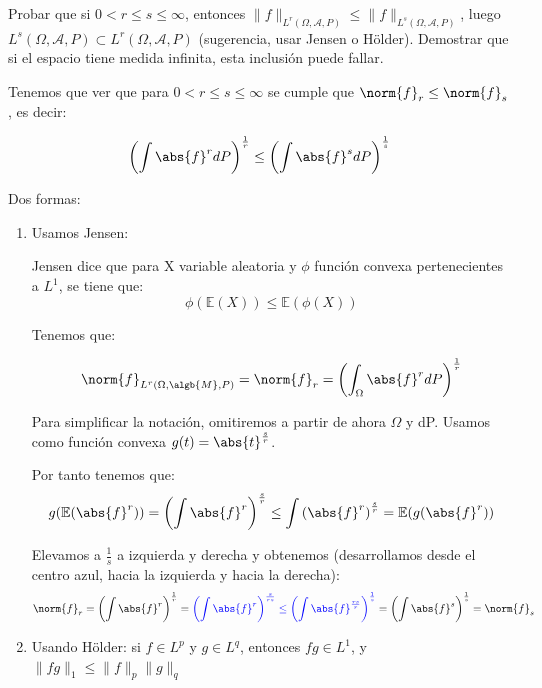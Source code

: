 \begin{problem}[8] Probar que si $0 < r\le s \le \infty$,
 entonces $\|f\|_{L^r(\Omega, \mathcal{A}, P)}\le \|f\|_{L^s(\Omega, \mathcal{A}, P)}$, luego $L^s(\Omega, \mathcal{A}, P) \subset L^r(\Omega, \mathcal{A}, P)$ (sugerencia, usar Jensen o H\"older). Demostrar que si el espacio tiene medida infinita, esta
inclusi\'on puede fallar.
\solution

\begin{expla}
Tenemos que ver que para $0 <r\leq s \leq \infty$ se cumple que $\norm{f}_r \leq \norm{f}_s$, es decir:

\[
\left( \int \abs{f}^r dP \right)^{\frac{1}{r}} \leq \left( \int \abs{f}^s dP \right)^{\frac{1}{s}}
\]



\end{expla}
Dos formas:
\begin{enumerate}
\item Usamos Jensen:

Jensen dice que para X variable aleatoria y $\phi$ función convexa pertenecientes a $L^1$, se tiene que:
\[
\phi(\mathbb{E}(X)) \leq \mathbb{E}(\phi(X))
\]


Tenemos que:

\[
\norm{f}_{L^r(\Omega, \algb{M}, P)} = \norm{f}_r= \left( \int_{\Omega} \abs{f}^r dP \right)^{\frac{1}{r}}
\]

Para simplificar la notación, omitiremos a partir de ahora $\Omega$ y dP. Usamos como función convexa $g(t)=\abs{t}^{\frac{s}{r}}$.

Por tanto tenemos que:
\[
g(\mathbb{E}(\abs{f}^r)) = \left(\int \abs{f}^r\right)^{\frac{s}{r}} \leq\int \left( \abs{f}^r \right)^{\frac{s}{r}} = \mathbb{E}(g(\abs{f}^r)) 
\]

Elevamos a $\frac{1}{s}$ a izquierda y derecha y obtenemos (desarrollamos desde el centro azul, hacia la izquierda y hacia la derecha):
\[
\norm{f}_r = \left(\int \abs{f}^r\right)^{\frac{1}{r}} = \textcolor{blue}{\left(\int \abs{f}^r\right)^{\frac{s}{rs}} \leq \left(\int \abs{f}^{\frac{rs}{r}}\right)^{\frac{1}{s}}} = \left(\int \abs{f}^s\right)^{\frac{1}{s}} = \norm{f}_s
\]



\item Usando Hölder:
si $f\in L^p$ y $g\in L^q$, entonces $fg\in L^1$, y $\|fg\|_1 \le \|f\|_p\|g\|_q$


\end{enumerate}
\end{problem}
